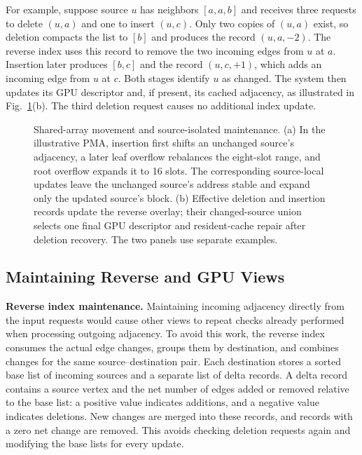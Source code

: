 For example, suppose source $u$ has neighbors $[a,a,b]$ and receives three requests to delete $(u,a)$ and one to insert $(u,c)$. Only two copies of $(u,a)$ exist, so deletion compacts the list to $[b]$ and produces the record $(u,a,-2)$. The reverse index uses this record to remove the two incoming edges from $u$ at $a$. Insertion later produces $[b,c]$ and the record $(u,c,+1)$, which adds an incoming edge from $u$ at $c$. Both stages identify $u$ as changed. The system then updates its GPU descriptor and, if present, its cached adjacency, as illustrated in Fig.~\ref{fig:2}(b). The third deletion request causes no additional index update.


\begin{figure}[t]
\centering
{}
\caption{Shared-array movement and source-isolated maintenance. (a) In the illustrative PMA, insertion first shifts an unchanged source's adjacency, a later leaf overflow rebalances the eight-slot range, and root overflow expands it to 16 slots. The corresponding source-local updates leave the unchanged source's address stable and expand only the updated source's block. (b) Effective deletion and insertion records update the reverse overlay; their changed-source union selects one final GPU descriptor and resident-cache repair after deletion recovery. The two panels use separate examples.}
\label{fig:2}
\end{figure}


\subsection{Maintaining Reverse and GPU Views}


\textbf{Reverse index maintenance.} Maintaining incoming adjacency directly from the input requests would cause other views to repeat checks already performed when processing outgoing adjacency. To avoid this work, the reverse index consumes the actual edge changes, groups them by destination, and combines changes for the same source--destination pair. Each destination stores a sorted base list of incoming sources and a separate list of delta records. A delta record contains a source vertex and the net number of edges added or removed relative to the base list: a positive value indicates additions, and a negative value indicates deletions. New changes are merged into these records, and records with a zero net change are removed. This avoids checking deletion requests again and modifying the base lists for every update.


